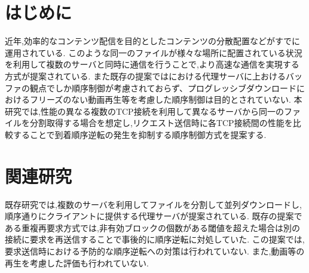 \documentclass{ltjsarticle}
\begin{document}
 
\vspace{-5mm}
\section{はじめに}
\vspace{-2mm}
近年,効率的なコンテンツ配信を目的としたコンテンツの分散配置などがすでに運用されている.
このような同一のファイルが様々な場所に配置されている状況を利用して複数のサーバと同時に通信を行うことで,より高速な通信を実現する方式が提案されている\cite{mhttp}\cite{proxy}.
また既存の提案ではにおける代理サーバに上おけるバッファの観点でしか順序制御が考慮されておらず、プログレッシブダウンロードにおけるフリーズのない動画再生等を考慮した順序制御は目的とされていない.
本研究では,性能の異なる複数のTCP接続を利用して異なるサーバから同一のファイルを分割取得する場合を想定し,リクエスト送信時に各TCP接続間の性能を比較することで到着順序逆転の発生を抑制する順序制御方式を提案する.
\vspace{-8mm}

\section{関連研究}
\vspace{-2mm}
既存研究では,複数のサーバを利用してファイルを分割して並列ダウンロードし,順序通りにクライアントに提供する代理サーバが提案されている\cite{proxy}.
既存の提案である重複再要求方式では,非有効ブロックの個数がある閾値を超えた場合は別の接続に要求を再送信することで事後的に順序逆転に対処していた.
この提案では,要求送信時における予防的な順序逆転への対策は行われていない.
また,動画等の再生を考慮した評価も行われていない.
\vspace{-8mm}
\end{document}
